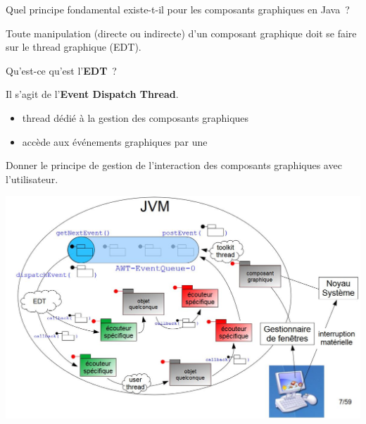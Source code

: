 \documentclass[12pt]{article}
\begin{document}
Quel principe fondamental existe-t-il pour les composants graphiques en Java~?

Toute manipulation (directe ou indirecte) d'un composant graphique doit se
faire sur le thread graphique (EDT).

\vphantom{}

Qu'est-ce qu'est l'\textbf{EDT}~?

Il s'agit de l'\textbf{Event Dispatch Thread}.

\begin{itemize}
  \item thread dédié à la gestion des composants graphiques
  \item accède aux événements graphiques par une 
\end{itemize}

\vphantom{}

Donner le principe de gestion de l'interaction des composants graphiques avec
l'utilisateur.

\includegraphics[scale=.7]{img/mpoo/idee_graphique.JPG}

\vphantom{}
\end{document}

